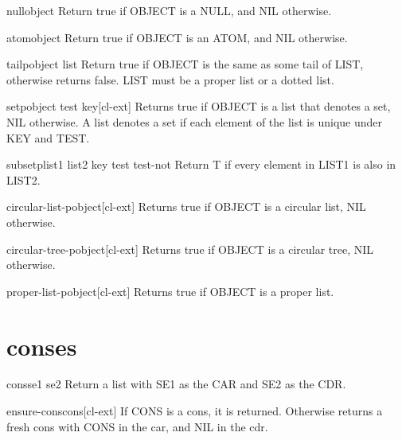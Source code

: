 \documentclass[10pt,english]{book}
\begin{document}
\begin{function}{null}{object}
  Return true if OBJECT is a NULL, and NIL otherwise.
\end{function}

\begin{function}{atom}{object}
  Return true if OBJECT is an ATOM, and NIL otherwise.
\end{function}

\begin{function}{tailp}{object list}
  Return true if OBJECT is the same as some tail of LIST, otherwise
   returns false. LIST must be a proper list or a dotted list.
\end{function}

\begin{function}{setp}{object \key test key}[cl-ext]
  Returns true if OBJECT is a list that denotes a set, NIL otherwise. A list
denotes a set if each element of the list is unique under KEY and TEST.
\end{function}

\begin{function}{subsetp}{list1 list2 \key key test test-not}
  Return T if every element in LIST1 is also in LIST2.
\end{function}

\begin{function}{circular-list-p}{object}[cl-ext]
  Returns true if OBJECT is a circular list, NIL otherwise.
\end{function}

\begin{function}{circular-tree-p}{object}[cl-ext]
  Returns true if OBJECT is a circular tree, NIL otherwise.
\end{function}

\begin{function}{proper-list-p}{object}[cl-ext]
  Returns true if OBJECT is a proper list.
\end{function}

\section{conses}
\label{sec:conses}

\begin{function}{cons}{se1 se2}
  Return a list with SE1 as the CAR and SE2 as the CDR.
\end{function}

\begin{function}{ensure-cons}{cons}[cl-ext]
  If CONS is a cons, it is returned. Otherwise returns a fresh cons with CONS
  in the car, and NIL in the cdr.
\end{function}
\end{document}

